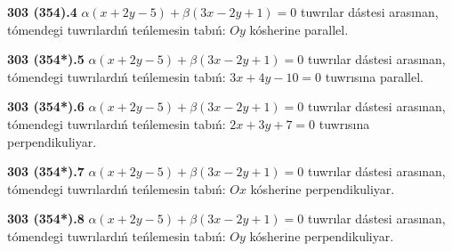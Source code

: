 \documentclass{article}
\begin{document}
\textbf{303 (354).4} $\alpha(x+2y-5)+\beta(3x-2y+1)=0$ tuwrılar
dástesi arasınan, tómendegi tuwrılardıń teńlemesin tabıń:
$Oy$ kósherine parallel.

\textbf{303 (354*).5} $\alpha(x+2y-5)+\beta(3x-2y+1)=0$ tuwrılar
dástesi arasınan, tómendegi tuwrılardıń teńlemesin tabıń:
$3x+4y-10=0$ tuwrısına parallel.

\textbf{303 (354*).6} $\alpha(x+2y-5)+\beta(3x-2y+1)=0$ tuwrılar
dástesi arasınan, tómendegi tuwrılardıń teńlemesin tabıń:
$2x+3y+7=0$ tuwrısına perpendikuliyar.

\textbf{303 (354*).7} $\alpha(x+2y-5)+\beta(3x-2y+1)=0$ tuwrılar
dástesi arasınan, tómendegi tuwrılardıń teńlemesin tabıń:
$Ox$ kósherine perpendikuliyar.

\textbf{303 (354*).8} $\alpha(x+2y-5)+\beta(3x-2y+1)=0$ tuwrılar
dástesi arasınan, tómendegi tuwrılardıń teńlemesin tabıń:
$Oy$ kósherine perpendikuliyar.
\end{document}
